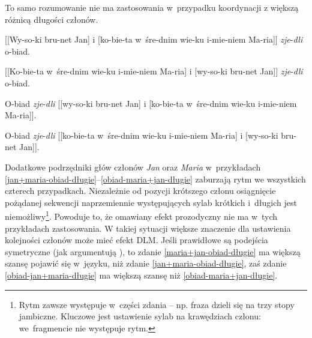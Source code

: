 To samo rozumowanie nie ma zastosowania w~przypadku koordynacji z większą różnicą długości członów.

  \begin{exe}
\ex \label{jan+maria-obiad-długie} {
        {[[Wy-so-ki bru-net Jan] i [ko-bie-ta w~śre-dnim wie-ku i-mie-niem Ma-ria]] \textit{zje}-\textit{dli} o-biad.}
        }
        
\ex \label{maria+jan-obiad-długie} {
        {[[Ko-bie-ta w~śre-dnim wie-ku i-mie-niem Ma-ria] i [wy-so-ki bru-net Jan]] \textit{zje}-\textit{dli} o-biad.}
        }
        
\ex \label{obiad-jan+maria-długie} {
        {O-biad \textit{zje}-\textit{dli} [[wy-so-ki bru-net Jan] i [ko-bie-ta w~śre-dnim wie-ku i-mie-niem Ma-ria]].}
        }

\ex \label{obiad-maria+jan-długie} {
        {O-biad \textit{zje}-\textit{dli} [[ko-bie-ta w~śre-dnim wie-ku i-mie-niem Ma-ria] i [wy-so-ki bru-net Jan]].}
        }
\end{exe}      

Dodatkowe podrzędniki głów członów \textit{Jan} oraz \textit{Maria} w~przykładach \eqref{jan+maria-obiad-długie}--\eqref{obiad-maria+jan-długie} zaburzają rytm we wszystkich czterech przypadkach. Niezależnie od pozycji krótszego członu osiągnięcie pożądanej sekwencji naprzemiennie występujących sylab krótkich i~długich jest niemożliwy\footnote{
Rytm zawsze występuje w~części zdania -- np. fraza  dzieli się na trzy stopy jambiczne. Kluczowe jest ustawienie sylab na krawędziach członu: we~fragmencie  nie występuje rytm.}.
Powoduje to, że omawiany efekt prozodyczny nie ma w~tych przykładach zastosowania. W takiej sytuacji większe znaczenie dla ustawienia kolejności członów może mieć efekt DLM. Jeśli prawidłowe są podejścia symetryczne (jak argumentują \citealt{przepiorkowski2023conjunct}), to zdanie \eqref{maria+jan-obiad-długie} ma większą szansę pojawić się w~języku, niż zdanie \eqref{jan+maria-obiad-długie}, zaś zdanie \eqref{obiad-jan+maria-długie} ma większą szansę niż \eqref{obiad-maria+jan-długie}.


